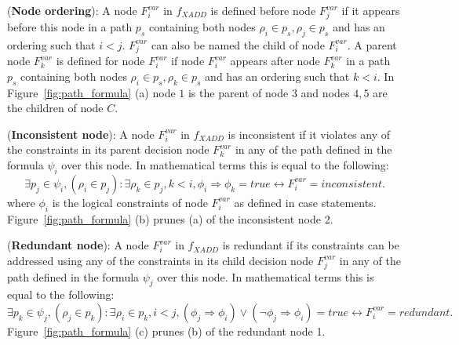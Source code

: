 \documentclass[twoside,11pt]{article}
\newenvironment{mydef}[1][Definition]{\begin{trivlist}
\item[\hskip \labelsep {\bfseries #1}]}{\end{trivlist}}
\begin{document}
\begin{mydef}(\textbf{Node ordering}):
A node $F_i^{var}$ in $f_{XADD}$ is defined before node $F_j^{var}$ if it appears before this node in a path $p_s$ containing both nodes $\rho_i \in p_s, \rho_j \in p_s$ and has an ordering such that $i<j$. $F_j^{var}$ can also be named the child of node $F_i^{var}$. A parent node $F_k^{var}$ is defined for node  $F_i^{var}$ if node  $F_i^{var}$ appears after node $F_k^{var}$ in a path $p_s$ containing both nodes $\rho_i \in p_s, \rho_k \in p_s$ and has an ordering such that $k<i$. In Figure~\ref{fig:path_formula} (a) node $1$ is the parent of node $3$ and nodes $4,5$ are the children of node $C$.
\end{mydef}

\begin{mydef}(\textbf{Inconsistent node}):
A node $F_i^{var}$ in $f_{XADD}$ is inconsistent if it violates any of the constraints in its parent decision node $F_k^{var}$ in any of the path defined in the formula $\psi_{i}$ over this node. In mathematical terms this is equal to the following: 
 \begin{equation}
\exists p_j \in \psi_i , (\rho_i \in p_j): \exists \rho_k \in p_j, k<i , \phi_i \Rightarrow \phi_k = \textit{true} \longleftrightarrow F_i^{var} = inconsistent. \label{inconsist}
\end{equation} 
where  $\phi_i$ is the logical constraints of node $F_i^{var}$ as defined in case statements. Figure~\ref{fig:path_formula} (b) prunes (a) of the inconsistent node 2.
\end{mydef}

\begin{mydef}(\textbf{Redundant node}):
A node $F_i^{var}$ in $f_{XADD}$ is redundant if its constraints can be addressed using any of the constraints in its child decision node $F_j^{var}$ in any of the path defined in the formula $\psi_{j}$ over this node. In mathematical terms this is equal to the following: 
 \begin{equation}
\exists p_k \in \psi_j , (\rho_j \in p_k): \exists \rho_i \in p_k, i<j , (\phi_j \Rightarrow \phi_i) \vee (\neg \phi_j \Rightarrow \phi_i) = \textit{true} \longleftrightarrow F_i^{var} = redundant.\label{redundant}
\end{equation} 
Figure~\ref{fig:path_formula} (c) prunes (b) of the redundant node 1.
\end{mydef}

\end{document}
